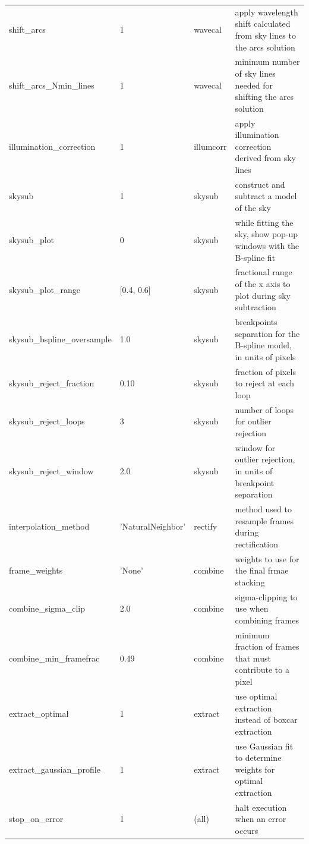 \documentclass[a4paper]{article}
\begin{document}
\begin{sloppypar}
\begin{table}
{\begin{tabular}{llll}
    shift\_arcs                   & 1             & wavecal          & apply wavelength shift calculated from sky lines to the arcs solution \\
    shift\_arcs\_Nmin\_lines      & 1             & wavecal          & minimum number of sky lines needed for shifting the arcs solution \\
    illumination\_correction      & 1             & illumcorr        & apply illumination correction derived from sky lines \\
    skysub                        & 1             & skysub           & construct and subtract a model of the sky \\
    skysub\_plot                  & 0             & skysub           & while fitting the sky, show pop-up windows with the B-spline fit \\
    skysub\_plot\_range           & [0.4, 0.6]    & skysub           & fractional range of the x axis to plot during sky subtraction \\
    skysub\_bspline\_oversample   & 1.0           & skysub           & breakpoints separation for the B-spline model, in units of pixels \\
    skysub\_reject\_fraction      & 0.10          & skysub           & fraction of pixels to reject at each loop \\
    skysub\_reject\_loops         & 3             & skysub           & number of loops for outlier rejection \\
    skysub\_reject\_window        & 2.0           & skysub           & window for outlier rejection, in units of breakpoint separation \\
    interpolation\_method         & 'NaturalNeighbor'  & rectify     & method used to resample frames during rectification \\
    frame\_weights                & 'None'        & combine          & weights to use for the final frmae stacking \\
    combine\_sigma\_clip          & 2.0           & combine          & sigma-clipping to use when combining frames \\
    combine\_min\_framefrac       & 0.49          & combine          & minimum fraction of frames that must contribute to a pixel \\
    extract\_optimal              & 1             & extract          & use optimal extraction instead of boxcar extraction \\
    extract\_gaussian\_profile    & 1             & extract          & use Gaussian fit to determine weights for optimal extraction \\
    stop\_on\_error               & 1             & (all)            & halt execution when an error occurs \\
    \hline
  \end{tabular}
  }
\end{table}





\end{sloppypar}
\end{document}
